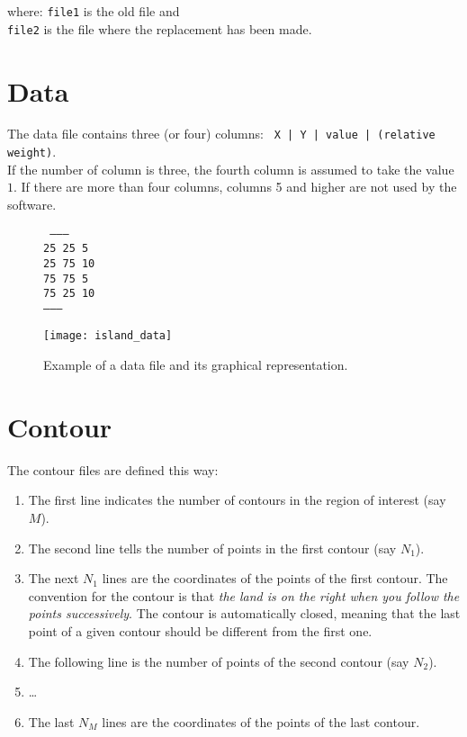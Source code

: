 where: \texttt{file1} is the old file and \\
\hphantom{where:} \texttt{file2} is the file where the replacement has been made.
\etips




\section{Data}

The data file contains three (or four) columns: \texttt{ X | Y | value | (relative weight)}.\\
If the number of column is three, the fourth column is assumed to take the value $1$. If there are more than four columns, columns 5 and higher are not used by the software.%

\begin{figure}[H]
\centering

\parbox{.5\textwidth}{
\begin{footnotesize}
\tt
--------\\
25 25	5\\
25 75 10\\
75 75 5\\
75 25 10\\
--------
\end{footnotesize}
}\parbox{.5\textwidth}{
\texttt{[image: island\_data]}
}
\caption{Example of a data file and its graphical representation.}
\end{figure}


\section{Contour\label{contourdiva}}

The contour files are defined this way:
\begin{enumerate}
\item The first line indicates the number of contours in the region of interest (say $M$).
\item The second line tells the number of points in the first contour (say $N_{1}$).
\item The next $N_1$ lines are the coordinates of the points of the first contour. The convention for the contour is that \textsl{the land is on the right when you follow the points successively}. The contour is automatically closed, meaning that the last point of a given contour should be different from the first one. 
\item The following line is the number of points of the second contour (say $N_{2}$).
\item \ldots
\item The last $N_M$ lines are the coordinates of the points of the last contour.
\end{enumerate}


